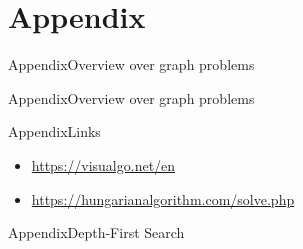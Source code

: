 
\section{Appendix}

\begin{frame}[allowframebreaks]{Appendix}{Overview over graph problems}
\end{frame}

\begin{frame}[allowframebreaks]{Appendix}{Overview over graph problems}
\end{frame}

\begin{frame}[allowframebreaks]{Appendix}{Links}
  \begin{itemize}
    \item \url{https://visualgo.net/en}
    \item \url{https://hungarianalgorithm.com/solve.php}
  \end{itemize}
\end{frame}

\begin{frame}[allowframebreaks]{Appendix}{Depth-First Search}
\end{frame}
